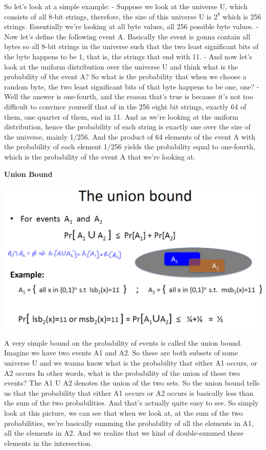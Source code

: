 \documentclass[11pt]{article}
\makeatletter
\def\maxwidth{\ifdim\Gin@nat@width>\linewidth\linewidth
    \else\Gin@nat@width\fi}
\let\Oldincludegraphics\includegraphics
\renewcommand{\includegraphics}[1]{\Oldincludegraphics[width=.8\maxwidth]{#1}}
\makeatother
\begin{document}
So let's look at a simple example: - Suppose we look at the universe U,
which consists of all 8-bit strings, therefore, the size of this
universe U is \(2^8\) which is 256 strings. Essentially we're looking at
all byte values, all 256 possible byte values. - Now let's define the
following event A. Basically the event is gonna contain all bytes so all
8-bit strings in the universe such that the two least significant bits
of the byte happens to be 1, that is, the strings that end with 11. -
And now let's look at the uniform distribution over the universe U and
think what is the probability of the event A? So what is the probability
that when we choose a random byte, the two least significant bits of
that byte happens to be one, one? - Well the answer is one-fourth, and
the reason that's true is because it's not too difficult to convince
yourself that of in the 256 eight bit strings, exactly 64 of them, one
quarter of them, end in 11. And as we're looking at the uniform
distribution, hence the probability of each string is exactly one over
the size of the universe, mainly 1/256. And the product of 64 elements
of the event A with the probability of each element 1/256 yields the
probability equal to one-fourth, which is the probability of the event A
that we're looking at.

\textbf{Union Bound}

\includegraphics{./Images/UnionBound.png}

A very simple bound on the probability of events is called the union
bound. Imagine we have two events A1 and A2. So these are both subsets
of some universe U and we wanna know what is the probability that either
A1 occurs, or A2 occurs In other words, what is the probability of the
union of these two events? The A1 U A2 denotes the union of the two
sets. So the union bound tells us that the probability that either A1
occurs or A2 occurs is basically less than the sum of the two
probabilities. And that's actually quite easy to see. So simply look at
this picture, we can see that when we look at, at the sum of the two
probabilities, we're basically summing the probability of all the
elements in A1, all the elements in A2. And we realize that we kind of
double-summed these elements in the intersection.
\end{document}
